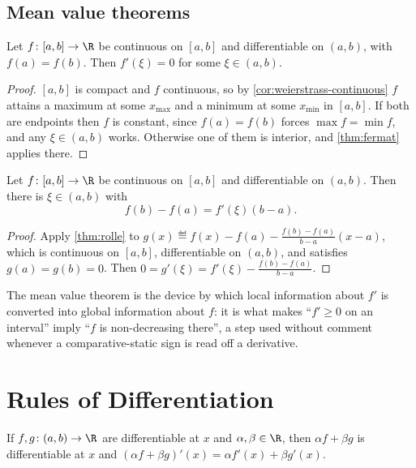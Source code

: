 \subsection{Mean value theorems}

\begin{theorem}[Rolle]\label{thm:rolle}
	Let $f\colon[a,b]\to\R$ be continuous on $[a,b]$ and differentiable on
	$(a,b)$, with $f(a)=f(b)$. Then $f'(\xi)=0$ for some $\xi\in(a,b)$.
\end{theorem}

\begin{proof}
	$[a,b]$ is compact and $f$ continuous, so by
	\autoref{cor:weierstrass-continuous} $f$ attains a maximum at some
	$x_{\max}$ and a minimum at some $x_{\min}$ in $[a,b]$. If both are endpoints
	then $f$ is constant, since $f(a)=f(b)$ forces $\max f=\min f$, and any
	$\xi\in(a,b)$ works. Otherwise one of them is interior, and
	\autoref{thm:fermat} applies there.
\end{proof}

\begin{theorem}\label{thm:mvt}
	Let $f\colon[a,b]\to\R$ be continuous on $[a,b]$ and differentiable on
	$(a,b)$. Then there is $\xi\in(a,b)$ with
	\[
		f(b)-f(a)=f'(\xi)(b-a).
	\]
\end{theorem}

\begin{proof}
	Apply \autoref{thm:rolle} to
	$g(x)\eqdef f(x)-f(a)-\frac{f(b)-f(a)}{b-a}(x-a)$, which is continuous on
	$[a,b]$, differentiable on $(a,b)$, and satisfies $g(a)=g(b)=0$. Then
	$0=g'(\xi)=f'(\xi)-\frac{f(b)-f(a)}{b-a}$.
\end{proof}

The mean value theorem is the device by which local information about $f'$ is
converted into global information about $f$: it is what makes ``$f'\geq0$ on an
interval'' imply ``$f$ is non-decreasing there'', a step used without comment
whenever a comparative-static sign is read off a derivative.

\section{Rules of Differentiation}\label{sec:c1-rules}

\begin{proposition}[Linearity]\label{prop:deriv-linear}
	If $f,g\colon(a,b)\to\R$ are differentiable at $x$ and $\alpha,\beta\in\R$, then
	$\alpha f+\beta g$ is differentiable at $x$ and
	$(\alpha f+\beta g)'(x)=\alpha f'(x)+\beta g'(x)$.
\end{proposition}

